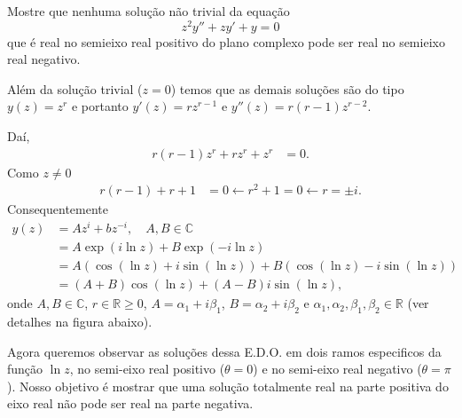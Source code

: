 \documentclass[a4paper,12pt, leqno, answers]{exam}
\begin{document}
\begin{questions}
    \question Mostre que nenhuma solu\c{c}\~{a}o n\~{a}o trivial da equa\c{c}\~{a}o
    \[
    z^2 y'' + z y' + y = 0
    \]
    que \'{e} real no semieixo real positivo do plano complexo pode ser real no semieixo real negativo.
    \begin{solution}
        Al\'{e}m da solu\c{c}\~{a}o trivial ($z = 0$) temos que as demais solu\c{c}\~{o}es s\~{a}o do tipo $y(z) = z^r$ e portanto $y'(z) = r z^{r - 1}$ e $y''(z) = r (r - 1) z^{r -2}$.

        Da\'{i},
        \begin{align*}
            r \left( r - 1 \right) z^r + r z^r + z^r &= 0.
        \end{align*}
        Como $z \neq 0$
        \begin{align*}
            r \left( r - 1 \right) + r + 1 &= 0 \leftarrow r^2 + 1 = 0 \leftarrow r = \pm i.
        \end{align*}
        Consequentemente
        \begin{align*}
            y(z) &= A z^i + b z^{-i}, \quad  A, B \in \mathbb{C} \\
            &= A \exp\left( i \ln z \right) + B \exp\left( -i \ln z \right) \\
            &= A \left( \cos\left( \ln z \right) + i \sin\left( \ln z \right) \right) + B \left( \cos\left( \ln z \right) - i \sin \left( \ln z \right) \right) \\
            &= \left( A + B \right) \cos\left( \ln z \right) + \left( A - B \right) i \sin\left( \ln z \right),
        \end{align*}
        onde $A, B \in \mathbb{C}$, $r \in \mathbb{R} \geq 0$, $A = \alpha_1 + i \beta_1$, $B = \alpha_2 + i \beta_2$ e $\alpha_1, \alpha_2, \beta_1, \beta_2 \in \mathbb{R}$ (ver detalhes na figura abaixo).
        \begin{center}
        \end{center}
        
        Agora queremos observar as solu\c cões dessa E.D.O. em dois ramos especificos da fun\c cão $\ln z$, no semi-eixo real positivo ($\theta = 0$) e no semi-eixo real negativo ($\theta = \pi$). Nosso objetivo é mostrar que uma solu\c cão totalmente real na parte positiva do eixo real não pode ser real na parte negativa.


\end{solution}
\end{questions}
\end{document}
